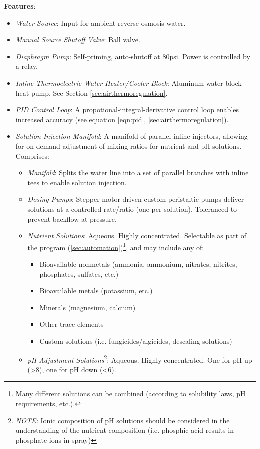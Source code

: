 \textbf{Features}:
\begin{itemize}
    \item \textit{Water Source}: Input for ambient reverse-osmosis water.
    \item \textit{Manual Source Shutoff Valve}: Ball valve.
    \item \textit{Diaphragm Pump}: Self-priming, auto-shutoff at 80psi. Power is controlled by a relay.
    \item \textit{Inline Thermoelectric Water Heater/Cooler Block}: Aluminum water block heat pump. See Section \ref{sec:airthermoregulation}.
    \item \textit{PID Control Loop}: A propotional-integral-derivative control loop enables increased accuracy (see equation \ref{eqn:pid}, \ref{sec:airthermoregulation}).
    \item \textit{Solution Injection Manifold}: A manifold of parallel inline injectors, allowing for on-demand adjustment of mixing ratios for nutrient and pH solutions. Comprises:
    \begin{itemize}
        \item \textit{Manifold}: Splits the water line into a set of parallel branches with inline tees to enable solution injection.
        \item \textit{Dosing Pumps}: Stepper-motor driven custom peristaltic pumps deliver solutions at a controlled rate/ratio (one per solution). Toleranced to prevent backflow at pressure. %
        \item \textit{Nutrient Solutions}: Aqueous. Highly concentrated. Selectable as part of the program (\ref{sec:automation})\footnote{Many different solutions can be combined (according to solubility laws, pH requirements, etc.).}, and may include any of:
        \begin{itemize}
            \item Bioavailable nonmetals (ammonia, ammonium, nitrates, nitrites, phosphates, sulfates, etc.)
            \item Bioavailable metals (potassium, etc.)
            \item Minerals (magnesium, calcium)
            \item Other trace elements
            \item Custom solutions (i.e. fungicides/algicides, descaling solutions)
        \end{itemize} 
        \item \textit{pH Adjustment Solutions}\footnote{\textit{NOTE:} Ionic composition of pH solutions should be considered in the understanding of the nutrient composition (i.e. phosphic acid results in phosphate ions in spray)}: Aqueous. Highly concentrated. One for pH up (>8), one for pH down (<6).

\end{itemize}
\end{itemize}
